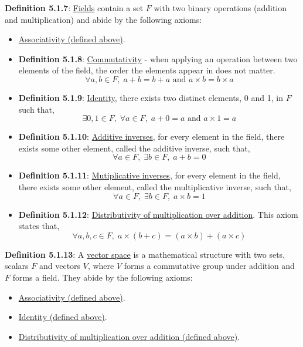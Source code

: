 \documentclass{article}
\newcommand{\separate}[1] {\vspace{#1 pt}\noindent}
\newcommand{\definition}[2]{\textbf{Definition #1}: #2\label{def:#1}}
\begin{document}
\separate{7}\definition{5.1.7}{\underline{Fields} contain a set \(F\) with two binary operations (addition and multiplication) and abide by the following axioms:}
\begin{itemize}
    \item \hyperref[def:5.1.4]{Associativity (defined above)}.
    \item \definition{5.1.8}{\underline{Commutativity} - when applying an operation between two elements of the field, the order the elements appear in does not matter.}
    \begin{equation}
        \forall a,b \in F,\; a+b = b+a \text{ and } a \times b = b \times a
    \end{equation}
    \item \definition{5.1.9}{\underline{Identity}, there exists two distinct elements, 0 and 1, in \(F\) such that,}
    \begin{equation}
        \exists 0,1 \in F,\; \forall a \in F,\; a + 0 = a \text{ and } a \times 1 = a
    \end{equation}
    \item \definition{5.1.10}{\underline{Additive inverses}, for every element in the field, there exists some other element, called the additive inverse, such that,}
    \begin{equation}
        \forall a \in F,\; \exists b \in F,\; a + b = 0
    \end{equation}
    \item \definition{5.1.11}{\underline{Mutiplicative inverses}, for every element in the field, there exists some other element, called the multiplicative inverse, such that,}
    \begin{equation}
        \forall a \in F,\; \exists b \in F,\; a \times b = 1
    \end{equation}
    \item \definition{5.1.12}{\underline{Distributivity of multiplication over addition}. This axiom states that,}
    \begin{equation}
        \forall a,b,c \in F,\; a \times (b+c) = (a \times b) + (a \times c)
    \end{equation}
\end{itemize}

\newpage\noindent\definition{5.1.13}{A \underline{vector space} is a mathematical structure with two sets, scalars \(F\) and vectors \(V\), where \(V\) forms a commutative group under addition and \(F\) forms a field. They abide by the following axioms:}
\begin{itemize}
    \item \hyperref[def:5.1.4]{Associativity (defined above)}.
    \item \hyperref[def:5.1.9]{Identity (defined above)}.
    \item \hyperref[def:5.1.12]{Distributivity of multiplication over addition (defined above)}.
\end{itemize}
\end{document}
